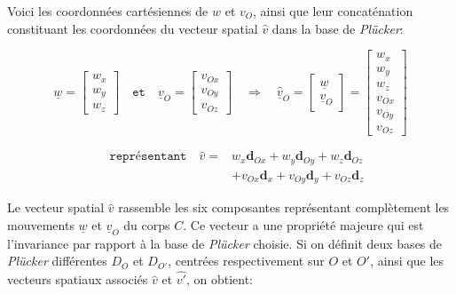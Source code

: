 \documentclass{report}
\begin{document}
Voici les coordonnées cartésiennes de $w$ et $v_{O}$, ainsi que leur concaténation constituant les coordonnées du vecteur spatial $\widehat{v}$ dans la base de \emph{Plücker}:\\

\begin{minipage}{.55\textwidth}
$$
\underline{w}=
\begin{bmatrix}
w_{x} \\
w_{y} \\
w_{z}
\end{bmatrix}
\quad \texttt{et} \quad
\underline{v}_{O}=
\begin{bmatrix}
v_{Ox} \\
v_{Oy} \\
v_{Oz}
\end{bmatrix}
\quad \Rightarrow \quad
\underline{\widehat{v}}_{O}=
\begin{bmatrix}
\underline{w} \\
\underline{v}_{O}
\end{bmatrix}
=
\begin{bmatrix}
w_{x} \\
w_{y} \\
w_{z} \\
v_{Ox} \\
v_{Oy} \\
v_{Oz}
\end{bmatrix}
$$
\end{minipage}
\begin{minipage}{.45\textwidth}
\begin{align*}
\quad \texttt{représentant} \quad
\widehat{v} = 
  &w_{x}\textbf{d}_{Ox} + w_{y}\textbf{d}_{Oy} + w_{z}\textbf{d}_{Oz} \\
  &+ v_{Ox}\textbf{d}_{x} + v_{Oy}\textbf{d}_{y} + v_{Oz}\textbf{d}_{z}
\end{align*}
\end{minipage}

\vspace{0.3cm} %

Le vecteur spatial $\widehat{v}$ rassemble les six composantes représentant complètement les mouvements $\underline{w}$ et $\underline{v}_{O}$ du corps $C$. Ce vecteur a une propriété majeure qui est l'invariance par rapport à la base de \emph{Plücker} choisie. Si on définit deux bases de \emph{Plücker} différentes $D_{O}$ et $D_{O'}$, centrées respectivement sur $O$ et $O'$, ainsi que les vecteurs spatiaux associés $\widehat{v}$ et $\widehat{v'}$, on obtient:
\end{document}
